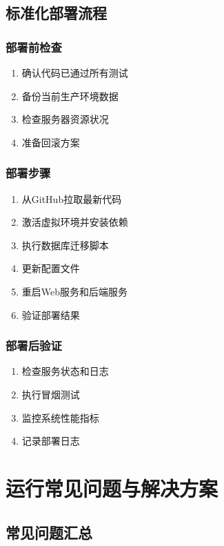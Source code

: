 \documentclass[a4paper]{article}
\begin{document}
\subsection{标准化部署流程}

\subsubsection{部署前检查}

\begin{enumerate}
    \item 确认代码已通过所有测试
    \item 备份当前生产环境数据
    \item 检查服务器资源状况
    \item 准备回滚方案
\end{enumerate}

\subsubsection{部署步骤}

\begin{enumerate}
    \item 从GitHub拉取最新代码
    \item 激活虚拟环境并安装依赖
    \item 执行数据库迁移脚本
    \item 更新配置文件
    \item 重启Web服务和后端服务
    \item 验证部署结果
\end{enumerate}

\subsubsection{部署后验证}

\begin{enumerate}
    \item 检查服务状态和日志
    \item 执行冒烟测试
    \item 监控系统性能指标
    \item 记录部署日志
\end{enumerate}

\section{运行常见问题与解决方案}

\subsection{常见问题汇总}
\end{document}
